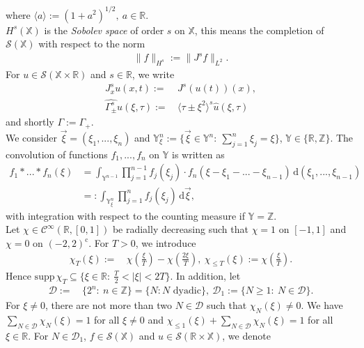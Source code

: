 \documentclass[reqno]{amsart}
\theoremstyle{Definitionl}
\theoremstyle{Definitionk}
\theoremstyle{definition}
\theoremstyle{Satzk}
\theoremstyle{Satzl}
\theoremstyle{Bemerkung}
\begin{document}
where $\langle a\rangle:= (1+a^2)^{1/2},\ a\in\mathbb R.$\\[10pt]
$H^s(\mathbb X)$ is the \emph{Sobolev space} of order $s$ on $\mathbb X$, this means the completion of $\mathcal S(\mathbb X)$ with respect to the norm
\begin{align*}
\|f\|_{H^s}:=\|J^sf\|_{L^2}.
\end{align*}
For $u\in\mathcal S(\mathbb X\times\mathbb R)$ and $s\in\mathbb R$, we write
\begin{align*}
J^s_xu(x,t):=&\, J^s(u(t))(x),\\
\widehat{\Gamma_{\pm}^s}u(\xi,\tau):=&\, \langle\tau\pm\xi^2\rangle^{s}\widehat{u}(\xi,\tau)
\end{align*}
and shortly $\Gamma:=\Gamma_+$.\\[10pt]
We consider $\vec\xi= (\xi_1,...,\xi_n)$ and $\mathbb Y^n_\xi:= \{\vec\xi\in\mathbb Y^n:\ \sum_{j=1}^n\xi_j=\xi\}$, $\mathbb Y\in\{\mathbb R,\mathbb Z\}$. The convolution of functions $f_1,...,f_n$ on $\mathbb Y$ is written as
\begin{align*}
f_1\ast...\ast f_n(\xi)&= \int_{\mathbb Y^{n-1}}\prod_{j=1}^{n-1}f_j(\xi_j)\cdot f_n(\xi-\xi_1-...-\xi_{n-1})\,\mathrm d(\xi_1,...,\xi_{n-1})\\
&=:\int_{\mathbb Y^n_\xi}\prod_{j=1}^nf_j(\xi_j)\,\mathrm d\vec\xi,
\end{align*}
with integration with respect to the counting measure if $\mathbb Y=\mathbb Z$.\\[10pt]
Let $\chi\in\mathcal C^\infty(\mathbb R,[0,1])$ be radially decreasing such that $\chi=1$ on $[-1,1]$ and $\chi=0$ on $(-2,2)^\mathrm{c}$. For $T>0$, we introduce
\begin{align*}
\chi_T(\xi):=&\,\chi\left(\frac\xi T\right)-\chi\left(\frac{2\xi}{T}\right),\ 
\chi_{\le T}(\xi):=\chi\left(\frac\xi{T}\right).
\end{align*}
Hence $\mathrm{supp}\, \chi_T\subseteq\{\xi\in\mathbb R:\ \frac T2<|\xi|<2T\}$. 
In addition, let
\begin{align*}
\mathcal D:=&\,\{2^n:\ n\in\mathbb Z\}=\{N: N\text{ dyadic}\},\ 
\mathcal D_{1}:=\{N\ge 1:\ N\in\mathcal D\}.
\end{align*}
For $\xi\ne0$, there are not more than two $N\in\mathcal D$ such that $\chi_N(\xi)\ne0$. We have $\sum_{N\in\mathcal D}\chi_N(\xi)=1$ for all $\xi\ne0$ and $\chi_{\le1}(\xi)+\sum_{N\in\mathcal D}\chi_N(\xi)=1$ for all $\xi\in\mathbb R$. For $N\in\mathcal D_1$, $f\in\mathcal S(\mathbb X)$ and $u\in\mathcal S(\mathbb R\times\mathbb X)$, we denote
\end{document}
